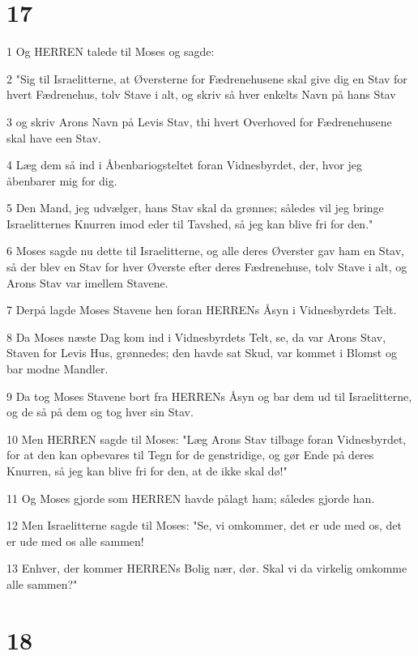 \chapter{17}

\par 1 Og HERREN talede til Moses og sagde:
\par 2 "Sig til Israelitterne, at Øversterne for Fædrenehusene skal give dig en Stav for hvert Fædrenehus, tolv Stave i alt, og skriv så hver enkelts Navn på hans Stav
\par 3 og skriv Arons Navn på Levis Stav, thi hvert Overhoved for Fædrenehusene skal have een Stav.
\par 4 Læg dem så ind i Åbenbariogsteltet foran Vidnesbyrdet, der, hvor jeg åbenbarer mig for dig.
\par 5 Den Mand, jeg udvælger, hans Stav skal da grønnes; således vil jeg bringe Israelitternes Knurren imod eder til Tavshed, så jeg kan blive fri for den."
\par 6 Moses sagde nu dette til Israelitterne, og alle deres Øverster gav ham en Stav, så der blev en Stav for hver Øverste efter deres Fædrenehuse, tolv Stave i alt, og Arons Stav var imellem Stavene.
\par 7 Derpå lagde Moses Stavene hen foran HERRENs Åsyn i Vidnesbyrdets Telt.
\par 8 Da Moses næste Dag kom ind i Vidnesbyrdets Telt, se, da var Arons Stav, Staven for Levis Hus, grønnedes; den havde sat Skud, var kommet i Blomst og bar modne Mandler.
\par 9 Da tog Moses Stavene bort fra HERRENs Åsyn og bar dem ud til Israelitterne, og de så på dem og tog hver sin Stav.
\par 10 Men HERREN sagde til Moses: "Læg Arons Stav tilbage foran Vidnesbyrdet, for at den kan opbevares til Tegn for de genstridige, og gør Ende på deres Knurren, så jeg kan blive fri for den, at de ikke skal dø!"
\par 11 Og Moses gjorde som HERREN havde pålagt ham; således gjorde han.
\par 12 Men Israelitterne sagde til Moses: "Se, vi omkommer, det er ude med os, det er ude med os alle sammen!
\par 13 Enhver, der kommer HERRENs Bolig nær, dør. Skal vi da virkelig omkomme alle sammen?"

\chapter{18}

